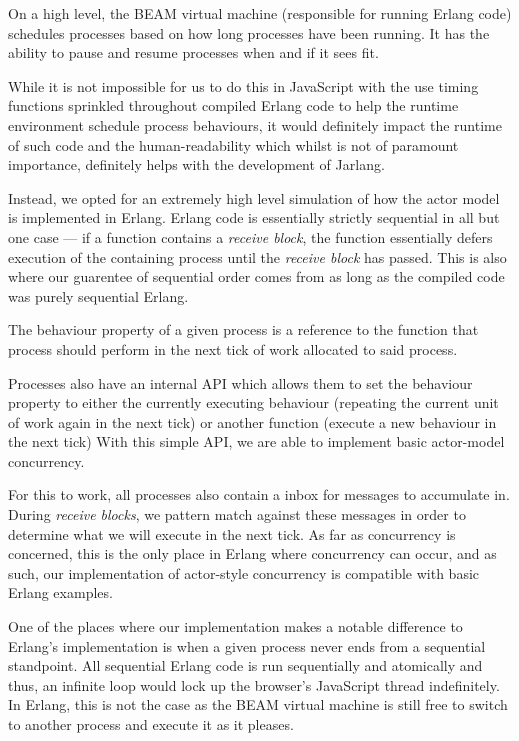 \documentclass[twoside,12pt,titlepage,a4paper]{article}
\begin{document}
On a high level, the BEAM virtual machine (responsible for running Erlang code) schedules processes based on how long processes have been running. It has the ability to pause and resume processes when and if it sees fit. 

While it is not impossible for us to do this in JavaScript with the use timing functions sprinkled throughout compiled Erlang code to help the runtime environment schedule process behaviours, it would definitely impact the runtime of such code and the human-readability which whilst is not of paramount importance, definitely helps with the development of Jarlang.

Instead, we opted for an extremely high level simulation of how the actor model is implemented in Erlang. Erlang code is essentially strictly sequential in all but one case --- if a function contains a \textit{receive block}, the function essentially defers execution of the containing process until the \textit{receive block} has passed. This is also where our guarentee of sequential order comes from as long as the compiled code was purely sequential Erlang.

The behaviour property of a given process is a reference to the function that process should perform in the next tick of work allocated to said process. 

Processes also have an internal API which allows them to set the behaviour property to either the currently executing behaviour (repeating the current unit of work again in the next tick) or another function (execute a new behaviour in the next tick) With this simple API, we are able to implement basic actor-model concurrency.

For this to work, all processes also contain a inbox for messages to accumulate in. During \textit{receive blocks}, we pattern match against these messages in order to determine what we will execute in the next tick. As far as concurrency is concerned, this is the only place in Erlang where concurrency can occur, and as such, our implementation of actor-style concurrency is compatible with basic Erlang examples.

One of the places where our implementation makes a notable difference to Erlang's implementation is when a given process never ends from a sequential standpoint. All sequential Erlang code is run sequentially and atomically and thus, an infinite loop would lock up the browser's JavaScript thread indefinitely. In Erlang, this is not the case as the BEAM virtual machine is still free to switch to another process and execute it as it pleases.
\end{document}
